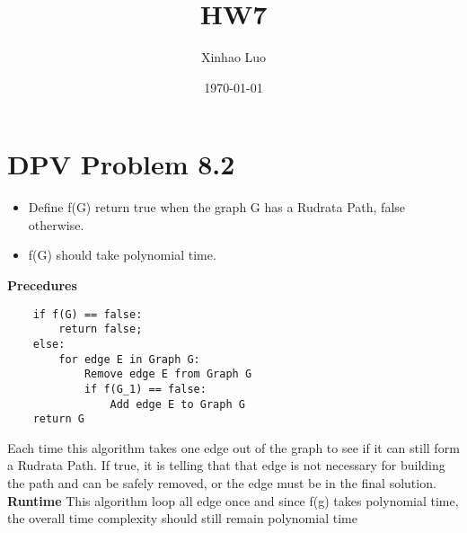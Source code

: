 \documentclass{article}
\title{HW7}
\author{Xinhao Luo}
\date{\today}
\begin{document}
\maketitle

\section{DPV Problem 8.2}

\begin{itemize}
    \item Define f(G) return true when the graph G has a Rudrata Path, false otherwise.
    \item f(G) should take polynomial time.
\end{itemize}


\textbf{Precedures}
\begin{verbatim}
    if f(G) == false:
        return false;
    else:
        for edge E in Graph G:
            Remove edge E from Graph G
            if f(G_1) == false:
                Add edge E to Graph G
    return G
\end{verbatim}

Each time this algorithm takes one edge out of the graph to see if it can still form a Rudrata Path. If true, it is telling that that edge is not necessary for building the path and can be safely removed, or the edge must be in the final solution. \\
\textbf{Runtime} This algorithm loop all edge once and since f(g) takes polynomial time, the overall time complexity should still remain polynomial time
\end{document}
